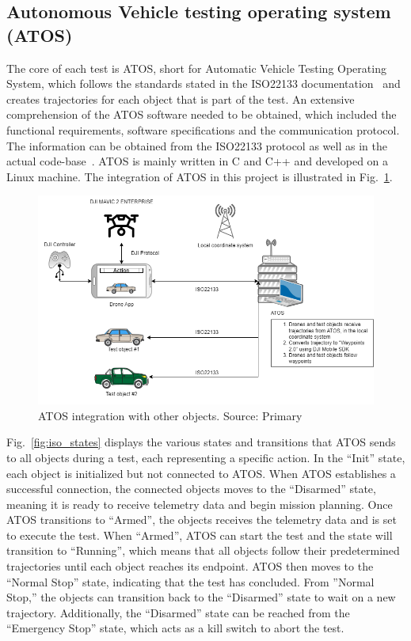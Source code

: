 \subsection{Autonomous Vehicle testing operating system (ATOS)} \label{ATOS}
The core of each test is ATOS, short for Automatic Vehicle Testing Operating System, which follows the standards stated in the ISO22133 documentation~\cite{iso22133} and creates trajectories for each object that is part of the test. An extensive comprehension of the ATOS software needed to be obtained, which included the functional requirements, software specifications and the communication protocol. The information can be obtained from the ISO22133 protocol as well as in the actual code-base~\cite{AstaZero2023ATOS:Systems.}. ATOS is mainly written in C and C++ and developed on a Linux machine. The integration of ATOS in this project is illustrated in Fig.~\ref{fig:ATOS-flow}.
\begin{figure}[H]
  \centering
  \includegraphics[width=\columnwidth]{figure/flow_config.png}
  \caption{ATOS integration with other objects. Source: Primary}
  \label{fig:ATOS-flow}
\end{figure}
Fig.~\ref{fig:iso_states} displays the various states and transitions that ATOS sends to all objects during a test, each representing a specific action. In the ``Init'' state, each object is initialized but not connected to ATOS. When ATOS establishes a successful connection, the connected objects moves to the ``Disarmed'' state, meaning it is ready to receive telemetry data and begin mission planning. Once ATOS transitions to ``Armed'', the objects receives the telemetry data and is set to execute the test. When ``Armed'', ATOS can start the test and the state will transition to ``Running'', which means that all objects follow their predetermined trajectories until each object reaches its endpoint. ATOS then moves to the ``Normal Stop'' state, indicating that the test has concluded. From ''Normal Stop,'' the objects can transition back to the ``Disarmed'' state to wait on a new trajectory. Additionally, the ``Disarmed'' state can be reached from the ``Emergency Stop'' state, which acts as a kill switch to abort the test.


